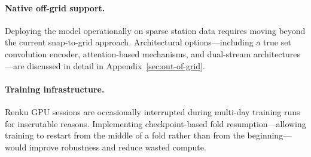 \paragraph{Native off-grid support.}
Deploying the model operationally on sparse station data requires moving beyond the current snap-to-grid approach. Architectural options---including a true set convolution encoder, attention-based mechanisms, and dual-stream architectures---are discussed in detail in Appendix~\ref{sec:out-of-grid}.

\paragraph{Training infrastructure.}
Renku GPU sessions are occasionally interrupted during multi-day training runs for inscrutable reasons. Implementing checkpoint-based fold resumption---allowing training to restart from the middle of a fold rather than from the beginning---would improve robustness and reduce wasted compute.
